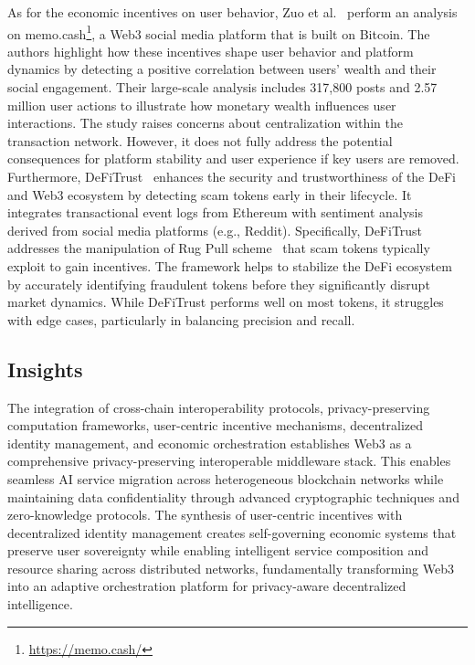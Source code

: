 \documentclass[5p,twocolumn]{elsarticle}
\begin{document}
As for the economic incentives on user behavior, Zuo et al.~\cite{zuo2023set} perform an analysis on memo.cash\footnote{\url{https://memo.cash/}}, a Web3 social media platform that is built on Bitcoin. The authors highlight how these incentives shape user behavior and platform dynamics by detecting a positive correlation between users' wealth and their social engagement. Their large-scale analysis includes 317,800 posts and 2.57 million user actions to illustrate how monetary wealth influences user interactions. The study raises concerns about centralization within the transaction network. However, it does not fully address the potential consequences for platform stability and user experience if key users are removed. Furthermore, DeFiTrust~\cite{gunathilaka2024defitrust} enhances the security and trustworthiness of the DeFi and Web3 ecosystem by detecting scam tokens early in their lifecycle. It integrates transactional event logs from Ethereum with sentiment analysis derived from social media platforms (e.g., Reddit). Specifically, DeFiTrust addresses the manipulation of Rug Pull scheme~\cite{zhou2024stop} that scam tokens typically exploit to gain incentives. The framework helps to stabilize the DeFi ecosystem by accurately identifying fraudulent tokens before they significantly disrupt market dynamics. While DeFiTrust performs well on most tokens, it struggles with edge cases, particularly in balancing precision and recall.

\subsection{Insights}
The integration of cross-chain interoperability protocols, privacy-preserving computation frameworks, user-centric incentive mechanisms, decentralized identity management, and economic orchestration establishes Web3 as a comprehensive privacy-preserving interoperable middleware stack. This enables seamless AI service migration across heterogeneous blockchain networks while maintaining data confidentiality through advanced cryptographic techniques and zero-knowledge protocols. The synthesis of user-centric incentives with decentralized identity management creates self-governing economic systems that preserve user sovereignty while enabling intelligent service composition and resource sharing across distributed networks, fundamentally transforming Web3 into an adaptive orchestration platform for privacy-aware decentralized intelligence.
\end{document}

